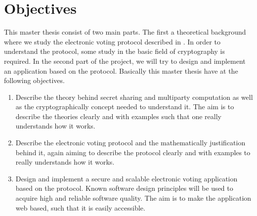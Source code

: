 \section{Objectives}
This master thesis consist of two main parts. The first a theoretical background where we study the electronic voting protocol described in \cite{Schoenmakers1999}. In order to understand the protocol, some study in the basic field of cryptography is required. In the second part of the project, we will try to design and implement an application based on the protocol. Basically this master thesis have at the following objectives. 

\begin{enumerate}
    \item   Describe the theory behind secret sharing and multiparty computation as well as the cryptographically concept needed to understand it. The aim is to describe the theories clearly and with examples such that one really understands how it works. 
            
    \item   Describe the electronic voting protocol \cite{Schoenmakers1999} and the mathematically justification behind it, again aiming to describe the protocol clearly and with examples to really understands how it works.
    
    \item   Design and implement a secure and scalable electronic voting application based on the protocol. Known software design principles will be used to acquire high and reliable software quality.
    The aim is to make the application web based, such that it is easily accessible.
\end{enumerate}


